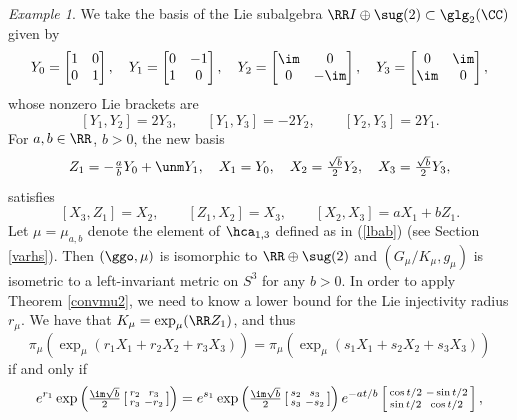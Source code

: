 \documentclass[11pt]{amsart}
\theoremstyle{plain}
\theoremstyle{definition}
\theoremstyle{remark}
\newtheorem{example}[theorem]{Example}
\begin{document}
\begin{example}\label{lieinj}
We take the basis of the Lie subalgebra $\RR I\oplus\sug(2)\subset\glg_2(\CC)$ given by
$$
Y_0=\left[\begin{matrix} 1&0 \\ 0&1 \end{matrix}\right], \quad
Y_1=\left[\begin{matrix} 0&-1 \\ 1&0 \end{matrix}\right], \quad
Y_2=\left[\begin{matrix} \im&0 \\ 0&-\im \end{matrix}\right], \quad
Y_3=\left[\begin{matrix} 0&\im \\ \im&0 \end{matrix}\right],
$$
whose nonzero Lie brackets are
$$
[Y_1,Y_2]=2Y_3, \qquad [Y_1,Y_3]=-2Y_2, \qquad [Y_2,Y_3]=2Y_1.
$$
For $a,b\in\RR$, $b>0$, the new basis
$$
Z_1=-\tfrac{a}{b}Y_0+\unm Y_1, \quad X_1=Y_0, \quad X_2=\tfrac{\sqrt{b}}{2}Y_2, \quad X_3=\tfrac{\sqrt{b}}{2}Y_3,
$$
satisfies
\begin{equation}\label{lbab}
[X_3,Z_1]=X_2, \qquad [Z_1,X_2]=X_3, \qquad [X_2,X_3]=aX_1+bZ_1.
\end{equation}
Let $\mu=\mu_{a,b}$ denote the element of $\hca_{1,3}$ defined as in (\ref{lbab}) (see Section \ref{varhs}).  Then $(\ggo,\mu)$ is isomorphic to $\RR\oplus\sug(2)$ and $(G_\mu/K_\mu,g_\mu)$ is isometric to a left-invariant metric on $S^3$ for any $b>0$.  In order to apply Theorem \ref{convmu2}, we need to know a lower bound for the Lie injectivity radius $r_\mu$.  We have that $K_\mu=\exp_\mu(\RR Z_1)$, and thus
\begin{equation}\label{expeq}
\pi_\mu(\exp_\mu(r_1X_1+r_2X_2+r_3X_3))=\pi_\mu(\exp_\mu(s_1X_1+s_2X_2+s_3X_3))
\end{equation}
if and only if
$$
e^{r_1}\exp\left(\tfrac{\im\sqrt{b}}{2}\left[\begin{smallmatrix} r_2&r_3 \\ r_3&-r_2 \end{smallmatrix}\right]\right)
=e^{s_1}\exp\left(\tfrac{\im\sqrt{b}}{2}\left[\begin{smallmatrix} s_2&s_3 \\ s_3&-s_2 \end{smallmatrix}\right]\right)e^{-at/b} \left[\begin{smallmatrix} \cos{t/2}&-\sin{t/2} \\ \sin{t/2}&\cos{t/2} \end{smallmatrix}\right],
$$
\end{example}
\end{document}
